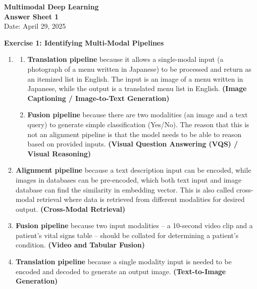 \documentclass[11pt]{article}
\begin{document}
\begin{center}
    {\Large \textbf{Multimodal Deep Learning}} \\ [0.3em]
    {\large \textbf{Answer Sheet 1}} \\ [0.3em]
    \large Date: April 29, 2025
\end{center}

\vspace{1cm}

\noindent
\textbf{Exercise 1: Identifying Multi-Modal Pipelines}

\begin{enumerate}[label=(\alph*)]
    \item  {
    \begin{enumerate}[label=\arabic*.]
        \item \textbf{Translation pipeline} because it allows a single-modal input (a photograph of a menu written in Japanese) to be processed and return as an itemized list in English. 
        The input is an image of a menu written in Japanese, while the output is a translated menu list in English.
        \textbf{(Image Captioning / Image-to-Text Generation)}
        \item \textbf{Fusion pipeline} because there are two modalities (an image and a text query) to generate simple classification (Yes/No).
        The reason that this is not an alignment pipeline is that the model needs to be able to reason based on provided inputs.
        \textbf{(Visual Question Answering (VQS) / Visual Reasoning)}
    \end{enumerate}
    }

    \item \textbf{Alignment pipeline} because a text description input can be encoded, while images in databases can be pre-encoded, which both text input and image database can find the similarity in embedding vector.
    This is also called cross-modal retrieval where data is retrieved from different modalities for desired output.
    \textbf{(Cross-Modal Retrieval)}

    \item \textbf{Fusion pipeline} because two input modalities -- a 10-second video clip and a patient’s vital signs table -- should be collated for determining a patient's condition.
    \textbf{(Video and Tabular Fusion)}

    \item \textbf{Translation pipeline} because a single modality input is needed to be encoded and decoded to generate an output image.
    \textbf{(Text-to-Image Generation)}
\end{enumerate}
\end{document}
